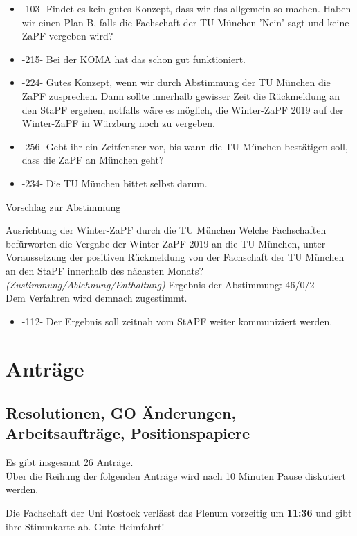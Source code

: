     \begin{itemize}
      \item -103- Findet es kein gutes Konzept, dass wir das allgemein so machen. Haben wir einen Plan B, falls die Fachschaft der TU München 'Nein' sagt und keine ZaPF vergeben wird?
      \item -215- Bei der KOMA hat das schon gut funktioniert.
      \item -224- Gutes Konzept, wenn wir durch Abstimmung der TU München die ZaPF zusprechen. Dann sollte innerhalb gewisser Zeit die Rückmeldung an den StaPF ergehen, notfalls wäre es möglich, die Winter-ZaPF 2019 auf der Winter-ZaPF in Würzburg noch zu vergeben.
      \item -256- Gebt ihr ein Zeitfenster vor, bis wann die TU München bestätigen soll, dass die ZaPF an München geht?
      \item -234- Die TU München bittet selbst darum.
    \end{itemize}
    Vorschlag zur Abstimmung

    \begin{success}{Ausrichtung der Winter-ZaPF durch die TU München}
      Welche Fachschaften befürworten die Vergabe der Winter-ZaPF 2019 an die TU München, unter Voraussetzung der positiven Rückmeldung von der Fachschaft der TU München an den StaPF innerhalb des nächsten Monats? \textit{(Zustimmung/Ablehnung/Enthaltung)}
      \tcblower
      Ergebnis der Abstimmung: 46/0/2 \\
      Dem Verfahren wird demnach zugestimmt.
    \end{success}

    \begin{itemize}
      \item -112- Der Ergebnis soll zeitnah vom StAPF weiter kommuniziert werden.
    \end{itemize}

\section{Anträge}
  \subsection{Resolutionen, GO Änderungen, Arbeitsaufträge, Positionspapiere}
    Es gibt insgesamt 26 Anträge. \\
    Über die Reihung der folgenden Anträge wird nach 10 Minuten Pause diskutiert werden.

    \begin{info}{}
      Die Fachschaft der Uni Rostock verlässt das Plenum vorzeitig um \textbf{11:36} und gibt ihre Stimmkarte ab. Gute Heimfahrt!
    \end{info}

